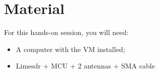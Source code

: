 \section*{Material}

For this hands-on session, you will need:
\begin{itemize}
    \item A computer with the VM installed;
    \item Limesdr + MCU + 2 antennas + SMA cable
\end{itemize}
